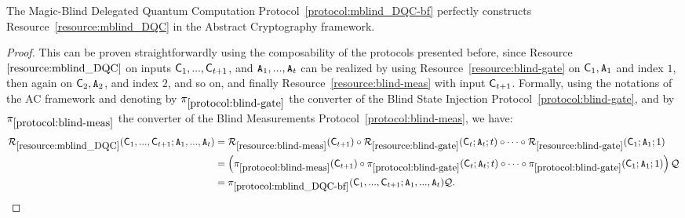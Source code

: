 \begin{theorem}
    \label{thm:mblind_DQC}
    The Magic-Blind Delegated Quantum Computation Protocol~\ref{protocol:mblind_DQC-bf} perfectly constructs Resource~\ref{resource:mblind_DQC}
    in the Abstract Cryptography framework.
    \end{theorem}
\begin{proof}
    This can be proven straightforwardly using the composability of the protocols presented before, since Resource ${\ref{resource:mblind_DQC}}$ on inputs $\mathsf{C}_1, ..., \mathsf{C}_{t+1}$, and $\mathtt{A}_1, ..., \mathtt{A}_t$ can be realized by using Resource~\ref{resource:blind-gate} on $\mathsf{C}_1, \mathtt{A}_1$ and index $1$, then again on $\mathsf{C}_2, \mathtt{A}_2$, and index $2$, and so on, and finally Resource~\ref{resource:blind-meas} with input $\mathsf{C}_{t+1}$.
      Formally, using the notations of the AC framework and denoting by $\pi_{\ref{protocol:blind-gate}}$ the converter of the Blind State Injection Protocol~\ref{protocol:blind-gate}, and by $\pi_{\ref{protocol:blind-meas}}$ the converter of the Blind Measurements Protocol~\ref{protocol:blind-meas}, we have:
      \begin{align}
          \mathcal R_{\ref{resource:mblind_DQC}}(\mathsf{C}_1, ..., \mathsf{C}_{t+1};\mathtt{A}_1, ..., \mathtt{A}_t)
          &=
          \mathcal R_{\ref{resource:blind-meas}}(\mathsf{C}_{t+1})
          \circ
          \mathcal R_{\ref{resource:blind-gate}}(\mathsf{C}_t; \mathtt{A}_t; t)
          \circ
          \cdots
          \circ
          \mathcal R_{\ref{resource:blind-gate}}(\mathsf{C}_1; \mathtt{A}_1; 1)
          \\
          &=
          \left( \pi_{\ref{protocol:blind-meas}}(\mathsf{C}_{t+1})
          \circ
          \pi_{\ref{protocol:blind-gate}}(\mathsf{C}_t; \mathtt{A}_t; t)
          \circ
          \cdots
          \circ
          \pi_{\ref{protocol:blind-gate}}(\mathsf{C}_1; \mathtt{A}_1; 1) \right)\mathcal Q
          \\
          &=
          \pi_{\ref{protocol:mblind_DQC-bf}}(\mathsf{C}_1, ..., \mathsf{C}_{t+1};\mathtt{A}_1, ..., \mathtt{A}_t) \mathcal Q.
      \end{align}
  \end{proof}

